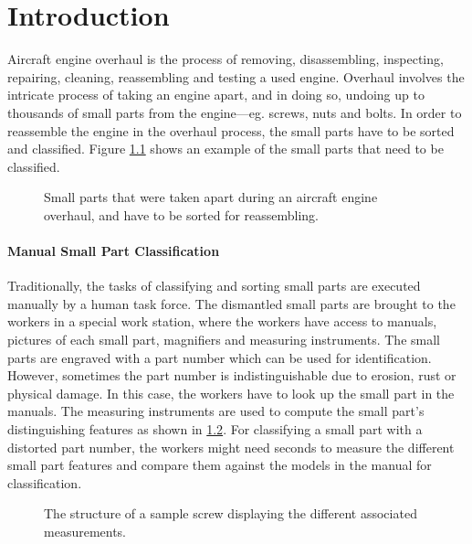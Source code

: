 \chapter{Introduction}\label{ch:introduction}

Aircraft engine overhaul is the process of removing, disassembling, inspecting, repairing, cleaning, reassembling and testing a used engine. Overhaul involves the intricate process of taking an engine apart, and in doing so, undoing up to thousands of small parts from the engine—eg. screws, nuts and bolts. In order to reassemble the engine in the overhaul process, the small parts have to be sorted and classified. Figure \ref{fig:unclassified_small_parts} shows an example of the small parts that need to be classified.

\begin{figure}[H]
\centering
{}
\caption{Small parts that were taken apart during an aircraft engine overhaul, and have to be sorted for reassembling.}
\label{fig:unclassified_small_parts}
\end{figure}

\subsubsection{Manual Small Part Classification}

Traditionally, the tasks of classifying and sorting small parts are executed manually by a human task force. The dismantled small parts are brought to the workers in a special work station, where the workers have access to manuals, pictures of each small part, magnifiers and measuring instruments. The small parts are engraved with a part number which can be used for identification. However, sometimes the part number is indistinguishable due to erosion, rust or physical damage. In this case, the workers have to look up the small part in the manuals. The measuring instruments are used to compute the small part's distinguishing features as shown in \ref{fig:small_part_structure}. For classifying a small part with a distorted part number, the workers might need seconds to measure the different small part features and compare them against the models in the manual for classification.

\begin{figure}[H]
\centering
{}
\caption{The structure of a sample screw displaying the different associated measurements.}
\label{fig:small_part_structure}
\end{figure}

